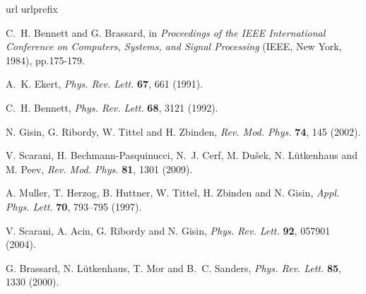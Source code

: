 \documentclass[twocolumn,aps,prl,floatfix,superscriptaddress]{revtex4-1}
\begin{document}

%

\begin{thebibliography}{10}
\expandafter\ifx\csname url\endcsname\relax
  \def\url#1{\texttt{#1}}\fi
\expandafter\ifx\csname urlprefix\endcsname\relax\def\urlprefix{URL }\fi
\providecommand{\bibinfo}[2]{#2}
\providecommand{\eprint}[2][]{\url{#2}}

\bibinfo{author}{C.~H. Bennett} and \bibinfo{author}{G. Brassard,}
\newblock \bibinfo{title}{in \textit{Proceedings of the IEEE International Conference on
  Computers, Systems, and Signal Processing} (IEEE, New York, 1984), pp.175-179.}

\bibinfo{author}{A.~K. Ekert,}
\newblock \emph{\bibinfo{journal}{Phys. Rev. Lett.}}
  \textbf{\bibinfo{volume}{67}}, \bibinfo{pages}{661} (\bibinfo{year}{1991}).

\bibinfo{author}{C.~H. Bennett,}
\newblock \emph{\bibinfo{journal}{Phys. Rev. Lett.}}
  \textbf{\bibinfo{volume}{68}}, \bibinfo{pages}{3121} (\bibinfo{year}{1992}).

\bibinfo{author}{N. Gisin}, \bibinfo{author}{G. Ribordy},
  \bibinfo{author}{W. Tittel} and \bibinfo{author}{H. Zbinden},
\newblock \emph{\bibinfo{journal}{Rev. Mod. Phys.}}
  \textbf{\bibinfo{volume}{74}}, \bibinfo{pages}{145} (\bibinfo{year}{2002}).

\bibinfo{author}{V. Scarani}, \bibinfo{author}{H. Bechmann-Pasquinucci}, \bibinfo{author}{N.~J. Cerf}, \bibinfo{author}{M. Du\v{s}ek}, \bibinfo{author}{N. L\"utkenhaus} and \bibinfo{author}{M. Peev},
\newblock \emph{\bibinfo{journal}{Rev. Mod. Phys.}}
  \textbf{\bibinfo{volume}{81}}, \bibinfo{pages}{1301} (\bibinfo{year}{2009}).

\bibinfo{author}{A. Muller}, \bibinfo{author}{T. Herzog}, \bibinfo{author}{B. Huttner}, \bibinfo{author}{W. Tittel}, \bibinfo{author}{H. Zbinden} and \bibinfo{author}{N. Gisin},
\newblock \emph{\bibinfo{journal}{Appl. Phys. Lett.}}
  \textbf{\bibinfo{volume}{70}}, \bibinfo{pages}{793--795}
  (\bibinfo{year}{1997}).

\bibinfo{author}{V. Scarani}, \bibinfo{author}{A. Acin},
  \bibinfo{author}{G. Ribordy} and \bibinfo{author}{N. Gisin},
  \newblock \emph{\bibinfo{journal}{Phys. Rev. Lett.}}
  \textbf{\bibinfo{volume}{92}}, \bibinfo{pages}{057901}
  (\bibinfo{year}{2004}).

\bibinfo{author}{G. Brassard}, \bibinfo{author}{N. L{\"u}tkenhaus},
  \bibinfo{author}{T. Mor} and \bibinfo{author}{B.~C. Sanders},
\newblock \emph{\bibinfo{journal}{Phys. Rev. Lett.}}
  \textbf{\bibinfo{volume}{85}}, \bibinfo{pages}{1330} (\bibinfo{year}{2000}).


\end{thebibliography}
\end{document}
